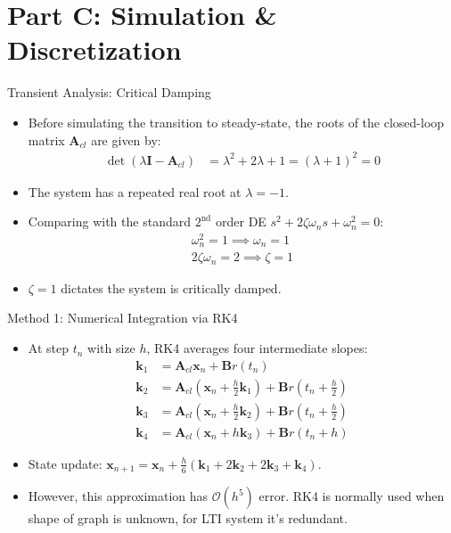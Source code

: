 \documentclass{beamer}
\theoremstyle{remark}
\let\vec\mathbf
\numberwithin{equation}{section}
\begin{document}
\section{Part C: Simulation \& Discretization}

\begin{frame}{Transient Analysis: Critical Damping}
    \begin{itemize}
        \item Before simulating the transition to steady-state, the roots of the closed-loop matrix $\vec{A}_{cl}$ are given by:
        \begin{align}
            \det(\lambda\vec{I} - \vec{A}_{cl}) &= \lambda^2 + 2\lambda + 1 = (\lambda + 1)^2 = 0
        \end{align}
        \item The system has a repeated real root at $\lambda = -1$.
        \item Comparing with the standard $2^{\text{nd}}$ order DE $s^2 + 2\zeta\omega_n s + \omega_n^2 = 0$:
        \begin{align}
            \omega_n^2 = 1 \implies \omega_n = 1 \\
            2\zeta\omega_n = 2 \implies \zeta = 1
        \end{align}
        \item $\zeta = 1$ dictates the system is critically damped.
    \end{itemize}
\end{frame}

\begin{frame}{Method 1: Numerical Integration via RK4}
    \begin{itemize}
        \item At step $t_n$ with size $h$, RK4 averages four intermediate slopes:
        \begin{align}
            \vec{k}_1 &= \vec{A}_{cl}\vec{x}_n + \vec{B}r(t_n) \\
            \vec{k}_2 &= \vec{A}_{cl}\left(\vec{x}_n + \frac{h}{2}\vec{k}_1\right) + \vec{B}r\left(t_n + \frac{h}{2}\right) \\
            \vec{k}_3 &= \vec{A}_{cl}\left(\vec{x}_n + \frac{h}{2}\vec{k}_2\right) + \vec{B}r\left(t_n + \frac{h}{2}\right) \\
            \vec{k}_4 &= \vec{A}_{cl}(\vec{x}_n + h\vec{k}_3) + \vec{B}r(t_n + h)
        \end{align}
        \item State update: $\vec{x}_{n+1} = \vec{x}_n + \frac{h}{6}(\vec{k}_1 + 2\vec{k}_2 + 2\vec{k}_3 + \vec{k}_4)$.
        \item However, this approximation has $\mathcal{O}(h^5)$ error. RK4 is normally used when shape of graph is unknown, for LTI system it's redundant.
    \end{itemize}
\end{frame}
\end{document}
